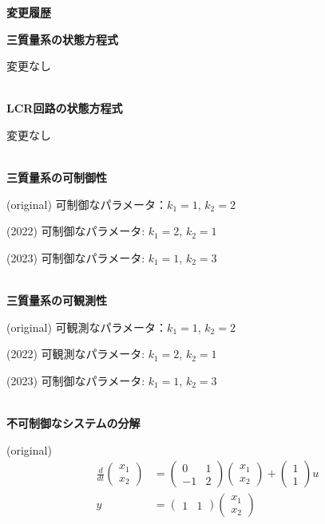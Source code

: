 \documentclass[a4paper,11pt,fleqn]{jreport}
\begin{document}
\begin{center}
	{\Large \bf 変更履歴}
\end{center}
	

\noindent
{\bf 三質量系の状態方程式}

変更なし

\ \\ \noindent
{\bf LCR回路の状態方程式}

変更なし

\ \\ \noindent
{\bf 三質量系の可制御性}

(original) 可制御なパラメータ：$k_1=1$, $k_2=2$

(2022) 可制御なパラメータ:{\color{red} $k_1=2$, $k_2=1$}

(2023) 可制御なパラメータ:{\color{red} $k_1=1$, $k_2=3$}

\ \\ \noindent
{\bf 三質量系の可観測性}

(original) 可観測なパラメータ：$k_1=1$, $k_2=2$

(2022) 可観測なパラメータ:{\color{red} $k_1=2$, $k_2=1$}

(2023) 可制御なパラメータ:{\color{red} $k_1=1$, $k_2=3$}


\ \\ \noindent
{\bf 不可制御なシステムの分解}

(original)
\begin{align*}
	\frac{d}{dt}
	\left (
	\begin{array}{c}
	 x_1 \\ x_2 
	\end{array}
	\right )
	& = 
	\left (
	\begin{array}{cc}
	 0 & 1 \\
	 -1 & 2
	\end{array}
	\right )
	\left (
	\begin{array}{c}
	 x_1 \\ x_2 
	\end{array}
	\right )
	+
	\left (
	\begin{array}{c}
	 1 \\ 1 
	\end{array}
	\right )
	u
\\
	y 
	&=
	\left (
	\begin{array}{cc}
	 1 & 1  
	\end{array}
	\right )
	\left (
	\begin{array}{c}
	 x_1 \\ x_2 
	\end{array}
	\right )
\end{align*}
\end{document}
